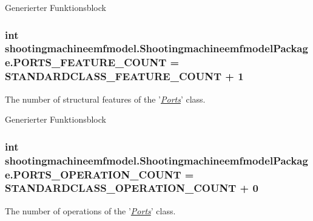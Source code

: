 Generierter Funktionsblock  \hypertarget{interfaceshootingmachineemfmodel_1_1_shootingmachineemfmodel_package_a1ea63d8ed0fd32dbb04f8c83812629eb}{
\subsubsection[{P\-O\-R\-T\-S\-\_\-\-F\-E\-A\-T\-U\-R\-E\-\_\-\-C\-O\-U\-N\-T}]{\setlength{\rightskip}{0pt plus 5cm}int shootingmachineemfmodel.\-Shootingmachineemfmodel\-Package.\-P\-O\-R\-T\-S\-\_\-\-F\-E\-A\-T\-U\-R\-E\-\_\-\-C\-O\-U\-N\-T = {\bf S\-T\-A\-N\-D\-A\-R\-D\-C\-L\-A\-S\-S\-\_\-\-F\-E\-A\-T\-U\-R\-E\-\_\-\-C\-O\-U\-N\-T} + 1}}\label{interfaceshootingmachineemfmodel_1_1_shootingmachineemfmodel_package_a1ea63d8ed0fd32dbb04f8c83812629eb}
The number of structural features of the '{\itshape \hyperlink{interfaceshootingmachineemfmodel_1_1_ports}{Ports}}' class.

Generierter Funktionsblock  \hypertarget{interfaceshootingmachineemfmodel_1_1_shootingmachineemfmodel_package_a566f821cfd14b88ba5e0b60e966fb9f3}{
\subsubsection[{P\-O\-R\-T\-S\-\_\-\-O\-P\-E\-R\-A\-T\-I\-O\-N\-\_\-\-C\-O\-U\-N\-T}]{\setlength{\rightskip}{0pt plus 5cm}int shootingmachineemfmodel.\-Shootingmachineemfmodel\-Package.\-P\-O\-R\-T\-S\-\_\-\-O\-P\-E\-R\-A\-T\-I\-O\-N\-\_\-\-C\-O\-U\-N\-T = {\bf S\-T\-A\-N\-D\-A\-R\-D\-C\-L\-A\-S\-S\-\_\-\-O\-P\-E\-R\-A\-T\-I\-O\-N\-\_\-\-C\-O\-U\-N\-T} + 0}}\label{interfaceshootingmachineemfmodel_1_1_shootingmachineemfmodel_package_a566f821cfd14b88ba5e0b60e966fb9f3}
The number of operations of the '{\itshape \hyperlink{interfaceshootingmachineemfmodel_1_1_ports}{Ports}}' class.

